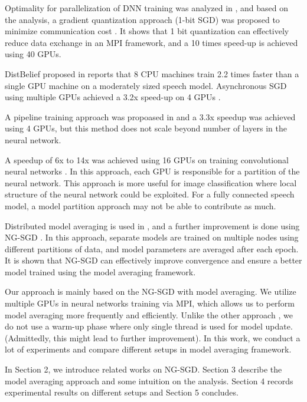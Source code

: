 \documentclass{article}
\begin{document}
Optimality for parallelization of DNN training was analyzed in \cite{seide2014parallelizability}, and based on the analysis, 
a gradient quantization approach (1-bit SGD) was proposed to minimize communication cost \cite{seide20141}. It shows that 1 bit
quantization can effectively reduce data exchange in an MPI framework, and a 10 times speed-up is achieved using 40 GPUs.

DistBelief proposed in \cite{dean2012large} reports that 8 CPU machines train 2.2 times faster than a single GPU machine on a
moderately sized speech model. Asynchronous SGD using multiple GPUs achieved a 3.2x speed-up on 4 GPUs \cite{zhang2013asynchronous}.

A pipeline training approach was propoased in \cite{chen2012pipelined} and a 3.3x speedup was achieved using 4 GPUs, but this
method does not scale beyond number of layers in the neural network.

A speedup of 6x to 14x was achieved using 16 GPUs on training convolutional neural networks \cite{coates2013deep}. In this approach,
each GPU is responsible for a partition of the neural network. This approach is more useful for image classification where 
local structure of the neural network could be exploited. For a fully connected speech model, a model partition approach 
may not be able to contribute as much.

Distributed model averaging is used in \cite{zhang2014improving,miao2014distributed}, and a further improvement 
is done using NG-SGD \cite{povey2014parallel}. In this approach, separate models are trained on multiple nodes using 
different partitions of data, and model parameters are averaged after each epoch. It is shown that NG-SGD can effectively improve
convergence and ensure a better model trained using the model averaging framework.

Our approach is mainly based on the NG-SGD with model averaging. We utilize multiple GPUs in neural networks training via 
MPI, which allows us to perform model averaging more frequently and efficiently. Unlike the other approach \cite{seide20141},
we do not use a warm-up phase where only single thread is used for model update. (Admittedly, this might lead to further improvement). 
In this work, we conduct a lot of experiments and compare different setups in model averaging framework.

In Section 2, we introduce related works on NG-SGD. Section 3 describe the model averaging approach and some 
intuition on the analysis. Section 4 records experimental results on different setups and Section 5 concludes.
\end{document}
